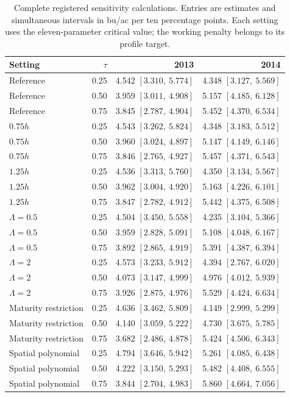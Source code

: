 \begin{table}[t]
\centering
\footnotesize
\caption{Complete registered sensitivity calculations. Entries are estimates and simultaneous intervals in bu/ac per ten percentage points. Each setting uses the eleven-parameter critical value; the working penalty belongs to its profile target.}
\label{tab:soy-sensitivity}
\begin{tabular}{lrrr}
\toprule
Setting & $\tau$ & 2013 & 2014 \\
\midrule
Reference & 0.25 & 4.542 $[3.310,\ 5.774]$ & 4.348 $[3.127,\ 5.569]$ \\
Reference & 0.50 & 3.959 $[3.011,\ 4.908]$ & 5.157 $[4.185,\ 6.128]$ \\
Reference & 0.75 & 3.845 $[2.787,\ 4.904]$ & 5.452 $[4.370,\ 6.534]$ \\
$0.75h$ & 0.25 & 4.543 $[3.262,\ 5.824]$ & 4.348 $[3.183,\ 5.512]$ \\
$0.75h$ & 0.50 & 3.960 $[3.024,\ 4.897]$ & 5.147 $[4.149,\ 6.146]$ \\
$0.75h$ & 0.75 & 3.846 $[2.765,\ 4.927]$ & 5.457 $[4.371,\ 6.543]$ \\
$1.25h$ & 0.25 & 4.536 $[3.313,\ 5.760]$ & 4.350 $[3.134,\ 5.567]$ \\
$1.25h$ & 0.50 & 3.962 $[3.004,\ 4.920]$ & 5.163 $[4.226,\ 6.101]$ \\
$1.25h$ & 0.75 & 3.847 $[2.782,\ 4.912]$ & 5.442 $[4.375,\ 6.508]$ \\
$\Lambda=0.5$ & 0.25 & 4.504 $[3.450,\ 5.558]$ & 4.235 $[3.104,\ 5.366]$ \\
$\Lambda=0.5$ & 0.50 & 3.959 $[2.828,\ 5.091]$ & 5.108 $[4.048,\ 6.167]$ \\
$\Lambda=0.5$ & 0.75 & 3.892 $[2.865,\ 4.919]$ & 5.391 $[4.387,\ 6.394]$ \\
$\Lambda=2$ & 0.25 & 4.573 $[3.233,\ 5.912]$ & 4.394 $[2.767,\ 6.020]$ \\
$\Lambda=2$ & 0.50 & 4.073 $[3.147,\ 4.999]$ & 4.976 $[4.012,\ 5.939]$ \\
$\Lambda=2$ & 0.75 & 3.926 $[2.875,\ 4.976]$ & 5.529 $[4.424,\ 6.634]$ \\
Maturity restriction & 0.25 & 4.636 $[3.462,\ 5.809]$ & 4.149 $[2.999,\ 5.299]$ \\
Maturity restriction & 0.50 & 4.140 $[3.059,\ 5.222]$ & 4.730 $[3.675,\ 5.785]$ \\
Maturity restriction & 0.75 & 3.682 $[2.486,\ 4.878]$ & 5.424 $[4.506,\ 6.343]$ \\
Spatial polynomial & 0.25 & 4.794 $[3.646,\ 5.942]$ & 5.261 $[4.085,\ 6.438]$ \\
Spatial polynomial & 0.50 & 4.222 $[3.150,\ 5.293]$ & 5.482 $[4.408,\ 6.555]$ \\
Spatial polynomial & 0.75 & 3.844 $[2.704,\ 4.983]$ & 5.860 $[4.664,\ 7.056]$ \\
\bottomrule
\end{tabular}
\end{table}
